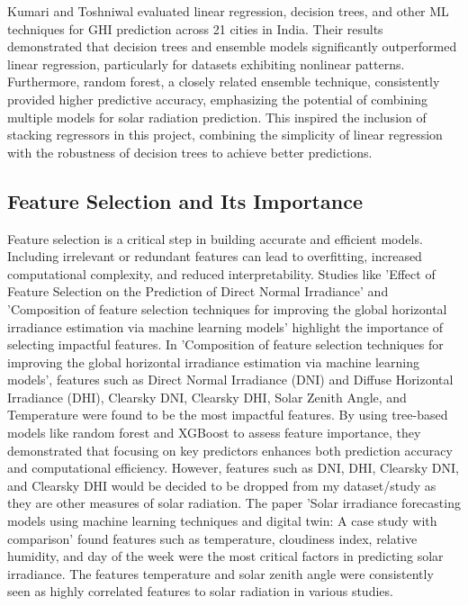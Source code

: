 \documentclass[10pt,twocolumn]{article}
\begin{document}
\begin{itemize}
Kumari and Toshniwal \cite{14} evaluated linear regression, decision trees, and other ML techniques for GHI prediction across 21 cities in India. Their results demonstrated that decision trees and ensemble models significantly outperformed linear regression, particularly for datasets exhibiting nonlinear patterns. Furthermore, random forest, a closely related ensemble technique, consistently provided higher predictive accuracy, emphasizing the potential of combining multiple models for solar radiation prediction. This inspired the inclusion of stacking regressors in this project, combining the simplicity of linear regression with the robustness of decision trees to achieve better predictions.

\subsection{Feature Selection and Its Importance}
Feature selection is a critical step in building accurate and efficient models. Including irrelevant or redundant features can lead to overfitting, increased computational complexity, and reduced interpretability. Studies like 'Effect of Feature Selection on the Prediction of
Direct Normal Irradiance' \cite{4} and 'Composition of feature selection techniques for improving the global horizontal irradiance estimation via machine learning models' highlight the importance of selecting impactful features.\cite{17} In 'Composition of feature selection techniques for improving the global horizontal irradiance estimation via machine learning models', features such as  Direct Normal Irradiance (DNI) and Diffuse Horizontal Irradiance (DHI), Clearsky DNI, Clearsky DHI, Solar Zenith Angle, and Temperature were found to be the most impactful features\cite{17}. By using tree-based models like random forest and XGBoost to assess feature importance, they demonstrated that focusing on key predictors enhances both prediction accuracy and computational efficiency. However, features such as DNI, DHI, Clearsky DNI, and Clearsky DHI would be decided to be dropped from my dataset/study as they are other measures of solar radiation. The paper 'Solar irradiance forecasting models using machine learning techniques and digital twin: A case study with comparison' found features such as temperature, cloudiness index, relative humidity, and day of the week were the most critical factors in predicting solar irradiance. The features temperature and solar zenith angle were consistently seen as highly correlated features to solar radiation in various studies.


\end{itemize}
\end{document}

